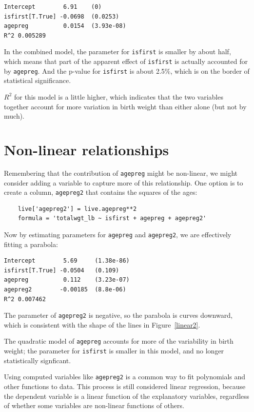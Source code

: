 \documentclass[12pt]{book}
\begin{document}
\begin{verbatim}
Intercept        6.91    (0)
isfirst[T.True] -0.0698  (0.0253)
agepreg          0.0154  (3.93e-08)
R^2 0.005289
\end{verbatim}

In the combined model, the parameter for {\tt isfirst} is smaller
by about half, which means that part of the apparent effect of
{\tt isfirst} is actually accounted for by {\tt agepreg}.  And
the p-value for {\tt isfirst} is about 2.5\%, which is on the
border of statistical significance.

$R^2$ for this model is a little higher, which indicates that the
two variables together account for more variation in birth weight
than either alone (but not by much).


\section{Non-linear relationships}
\label{nonlinear}

Remembering that the contribution of {\tt agepreg} might be non-linear,
we might consider adding a variable to capture more of this
relationship.  One option is to create a column, {\tt agepreg2}
that contains the squares of the ages:

\begin{verbatim}
    live['agepreg2'] = live.agepreg**2
    formula = 'totalwgt_lb ~ isfirst + agepreg + agepreg2'
\end{verbatim}

Now by estimating parameters for {\tt agepreg} and {\tt agepreg2},
we are effectively fitting a parabola:

\begin{verbatim}
Intercept        5.69     (1.38e-86)
isfirst[T.True] -0.0504   (0.109)
agepreg          0.112    (3.23e-07)
agepreg2        -0.00185  (8.8e-06)
R^2 0.007462
\end{verbatim}

The parameter of {\tt agepreg2} is negative, so the parabola is
curves downward, which is consistent with the shape of the lines
in Figure~\ref{linear2}.

The quadratic model of {\tt agepreg} accounts for more of the
variability in birth weight; the parameter for {\tt isfirst}
is smaller in this model, and no longer statistically signficant.

Using computed variables like {\tt agepreg2} is a common way to
fit polynomials and other functions to data.  
This process is still considered linear
regression, because the dependent variable is a linear function of
the explanatory variables, regardless of whether some variables
are non-linear functions of others.
\end{document}
